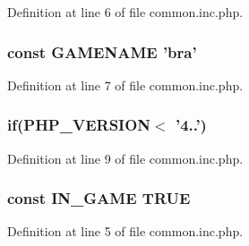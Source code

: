 Definition at line 6 of file common.\+inc.\+php.

\hypertarget{common_8inc_8php_a3cd7223880b2f6a1d0bcb325ce43c606}{
\subsubsection[{G\+A\+M\+E\+N\+A\+M\+E}]{\setlength{\rightskip}{0pt plus 5cm}const G\+A\+M\+E\+N\+A\+M\+E 'bra'}}\label{common_8inc_8php_a3cd7223880b2f6a1d0bcb325ce43c606}


Definition at line 7 of file common.\+inc.\+php.

\hypertarget{common_8inc_8php_a4ac1118c2e44c513a674bc1793ba6c90}{
\subsubsection[{if}]{\setlength{\rightskip}{0pt plus 5cm}if(P\+H\+P\+\_\+\+V\+E\+R\+S\+I\+O\+N$<$  '4..')}}\label{common_8inc_8php_a4ac1118c2e44c513a674bc1793ba6c90}


Definition at line 9 of file common.\+inc.\+php.

\hypertarget{common_8inc_8php_a12c82f3d28569a3f80804f1e72cef14c}{
\subsubsection[{I\+N\+\_\+\+G\+A\+M\+E}]{\setlength{\rightskip}{0pt plus 5cm}const I\+N\+\_\+\+G\+A\+M\+E T\+R\+U\+E}}\label{common_8inc_8php_a12c82f3d28569a3f80804f1e72cef14c}


Definition at line 5 of file common.\+inc.\+php.

